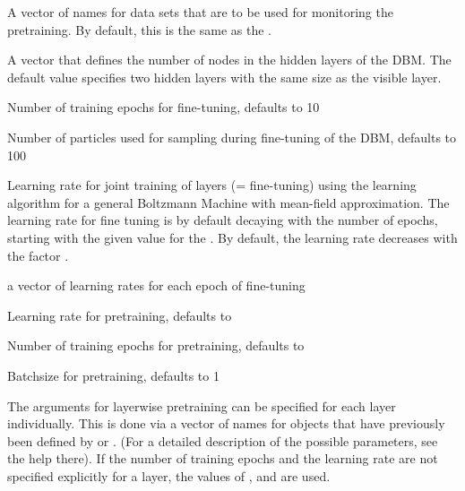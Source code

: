 \begin{Arguments}
\begin{ldescription}
\item[\code{monitoringdatapretraining}] A vector of names for data sets that are to be used for
monitoring the pretraining. By default, this is the same as the .

\item[\code{nhiddens}] A vector that defines the number of nodes in the hidden layers of
the DBM. The default value specifies two hidden layers with the same size
as the visible layer.

\item[\code{epochs}] Number of training epochs for fine-tuning, defaults to 10

\item[\code{nparticles}] Number of particles used for sampling during fine-tuning of the
DBM, defaults to 100

\item[\code{learningrate}] Learning rate for joint training of layers (= fine-tuning)
using the learning algorithm for a general Boltzmann Machine
with mean-field approximation.
The learning rate for fine tuning is by default decaying with the number of epochs,
starting with the given value for the .
By default, the learning rate decreases with the factor .

\item[\code{learningrates}] a vector of learning rates for each epoch of fine-tuning

\item[\code{learningratepretraining}] Learning rate for pretraining,
defaults to 

\item[\code{epochspretraining}] Number of training epochs for pretraining,
defaults to 

\item[\code{batchsizepretraining}] Batchsize for pretraining, defaults to 1

\item[\code{pretraining}] The arguments for layerwise pretraining
can be specified for each layer individually.
This is done via a vector of names for objects that have previously been defined
by  or .
(For a detailed description of the possible parameters,
see the help there).
If the number of training epochs and the learning rate are not specified
explicitly for a layer, the values of ,
 and  are used.
\end{ldescription}
\end{Arguments}
